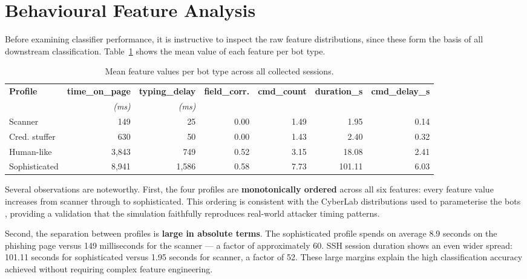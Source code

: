 \section{Behavioural Feature Analysis}

Before examining classifier performance, it is instructive to inspect
the raw feature distributions, since these form the basis of all
downstream classification. Table~\ref{tab:feature_means} shows the
mean value of each feature per bot type.

\begin{table}[h]
\centering
\caption{Mean feature values per bot type across all collected sessions.}
\label{tab:feature_means}
\begin{tabular}{lrrrrrr}
\hline
\textbf{Profile} & \textbf{time\_on\_page} & \textbf{typing\_delay} & \textbf{field\_corr.} & \textbf{cmd\_count} & \textbf{duration\_s} & \textbf{cmd\_delay\_s} \\
 & \textit{(ms)} & \textit{(ms)} & & & & \\
\hline
Scanner            & 149    & 25    & 0.00 & 1.49 & 1.95   & 0.14 \\
Cred. stuffer      & 630    & 50    & 0.00 & 1.43 & 2.40   & 0.32 \\
Human-like         & 3,843  & 749   & 0.52 & 3.15 & 18.08  & 2.41 \\
Sophisticated      & 8,941  & 1,586 & 0.58 & 7.73 & 101.11 & 6.03 \\
\hline
\end{tabular}
\end{table}

Several observations are noteworthy. First, the four profiles are
\textbf{monotonically ordered} across all six features: every feature
value increases from scanner through to sophisticated. This ordering is
consistent with the CyberLab distributions used to parameterise the
bots \cite{Alata2006Honeynet}, providing a validation that the simulation
faithfully reproduces real-world attacker timing patterns.

Second, the separation between profiles is \textbf{large in absolute
terms}. The sophisticated profile spends on average 8.9 seconds on the
phishing page versus 149 milliseconds for the scanner — a factor of
approximately 60. SSH session duration shows an even wider spread:
101.11 seconds for sophisticated versus 1.95 seconds for scanner, a
factor of 52. These large margins explain the high classification
accuracy achieved without requiring complex feature engineering.


